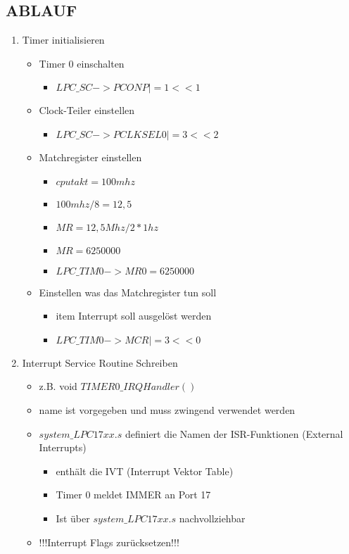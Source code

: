 \documentclass[11pt,a4paper,draft]{article}
\begin{document}
\subsection{ABLAUF}
\begin{enumerate}
\item Timer initialisieren
\begin{itemize}
\item Timer 0 einschalten
\begin{itemize}
\item $LPC\_SC->PCONP |=1<<1$
\end{itemize}
\item Clock-Teiler einstellen
\begin{itemize}
\item $LPC\_SC->PCLKSEL0 |=3<<2$
\end{itemize}
\item Matchregister einstellen
\begin{itemize}
\item $cpu takt = 100mhz$
\item $100mhz / 8 = 12,5$
\item $MR = 12,5Mhz/2*1hz$
\item $MR = 6250000$
\item $LPC\_TIM0->MR0 = 6250000$
\end{itemize}
\item Einstellen was das Matchregister tun soll
\begin{itemize}
\item item Interrupt soll ausgelöst werden
\item $LPC\_TIM0->MCR |= 3<<0$
\end{itemize}
\end{itemize}
\item Interrupt Service Routine Schreiben
\begin{itemize}
\item z.B. void $TIMER0\_IRQHandler()$
\item name ist vorgegeben und muss zwingend verwendet werden
\item $system\_LPC17xx.s$ definiert die Namen der ISR-Funktionen (External Interrupts)
\begin{itemize}
\item enthält die IVT (Interrupt Vektor Table)
\item Timer 0 meldet IMMER an Port 17
\item Ist über $system\_LPC17xx.s$ nachvollziehbar
\end{itemize}
\item !!!Interrupt Flags zurücksetzen!!!

\end{itemize}
\end{enumerate}
\end{document}
